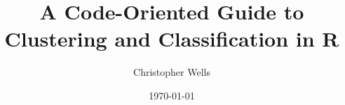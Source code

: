 \documentclass[a4paper,12pt]{book}
\begin{document}
\author{Christopher Wells}
\title{A Code-Oriented Guide to Clustering and Classification in R}
\date{\today}

\frontmatter
\maketitle
\tableofcontents

\mainmatter


\backmatter
\end{document}
